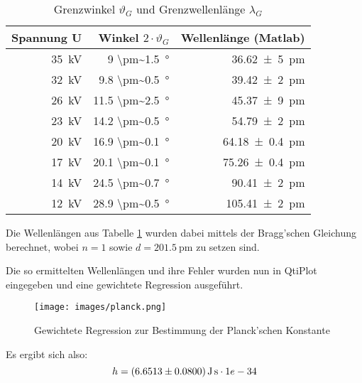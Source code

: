 \begin{table}[h!]
    \centering
    \small
    \caption{Grenzwinkel $\vartheta_G$ und Grenzwellenl\"ange $\lambda_G$}
    \label{tab:resultsPlanckManualFit}
    \begin{tabular}{rrr}
        \toprule
        Spannung U          & Winkel $2 \cdot \vartheta_G$      & Wellenl\"ange (Matlab) \\
        \midrule
        \SI{35}{\kilo\volt} &       \SI{9     \pm~1.5}{\degree} & \SI{ 36.62 \pm 5  }{\pico\meter} \\
        \SI{32}{\kilo\volt} &       \SI{9.8   \pm~0.5}{\degree} & \SI{ 39.42 \pm 2  }{\pico\meter} \\
        \SI{26}{\kilo\volt} &       \SI{11.5  \pm~2.5}{\degree} & \SI{ 45.37 \pm 9  }{\pico\meter} \\
        \SI{23}{\kilo\volt} &       \SI{14.2  \pm~0.5}{\degree} & \SI{ 54.79 \pm 2  }{\pico\meter} \\
        \SI{20}{\kilo\volt} &       \SI{16.9  \pm~0.1}{\degree} & \SI{ 64.18 \pm 0.4}{\pico\meter} \\
        \SI{17}{\kilo\volt} &       \SI{20.1  \pm~0.1}{\degree} & \SI{ 75.26 \pm 0.4}{\pico\meter} \\
        \SI{14}{\kilo\volt} &       \SI{24.5  \pm~0.7}{\degree} & \SI{ 90.41 \pm 2  }{\pico\meter} \\
        \SI{12}{\kilo\volt} &       \SI{28.9  \pm~0.5}{\degree} & \SI{105.41 \pm 2  }{\pico\meter} \\
        \bottomrule
    \end{tabular}
\end{table}

Die Wellenl\"angen  aus Tabelle \ref{tab:resultsPlanckManualFit}  wurden dabei
mittels  der  Bragg'schen Gleichung  berechnet,  wobei  $n  =  1$ sowie  $d  =
\SI{201.5}{\pico\meter}$ zu setzen sind.

Die so ermittelten Wellenl\"angen und ihre Fehler wurden nun in QtiPlot eingegeben
und eine gewichtete Regression ausgef\"uhrt.

\clearpage
\begin{figure}[h!]
    \centering
    \texttt{[image: images/planck.png]}
    \caption{Gewichtete Regression zur Bestimmung der Planck'schen Konstante}
    \label{fig:planck}
\end{figure}

Es ergibt sich also:
\begin{equation*}
    h = \SI{6.6513 \pm 0.08}{\joule\second} \cdot 1e-34
\end{equation*}

